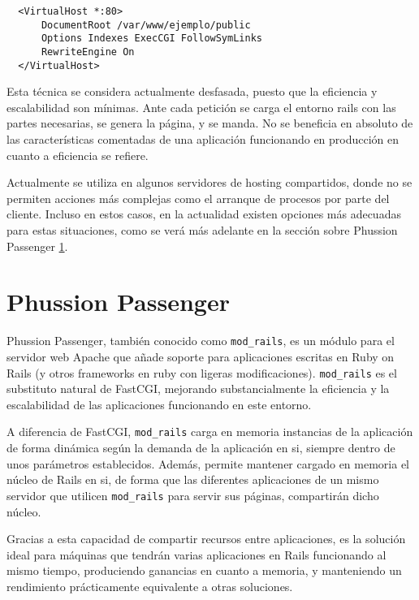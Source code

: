 \begin{verbatim}
  <VirtualHost *:80>
      DocumentRoot /var/www/ejemplo/public
      Options Indexes ExecCGI FollowSymLinks
      RewriteEngine On
  </VirtualHost>
\end{verbatim}

Esta técnica se considera actualmente desfasada, puesto que la eficiencia y escalabilidad son mínimas. Ante cada petición se carga el entorno rails con las partes necesarias, se genera la página, y se manda. No se beneficia en absoluto de las características comentadas de una aplicación funcionando en producción en cuanto a eficiencia se refiere.

Actualmente se utiliza en algunos servidores de hosting compartidos, donde no se permiten acciones más complejas como el arranque de procesos por parte del cliente. Incluso en estos casos, en la actualidad existen opciones más adecuadas para estas situaciones, como se verá más adelante en la sección sobre Phussion Passenger \ref{sub:phussion_passenger}.


\section{Phussion Passenger} %
\label{sub:phussion_passenger}

Phussion Passenger, también conocido como \texttt{mod\_rails}, es un módulo para el servidor web Apache que añade soporte para aplicaciones escritas en Ruby on Rails (y otros frameworks en ruby con ligeras modificaciones). \texttt{mod\_rails} es el substituto natural de FastCGI, mejorando substancialmente la eficiencia y la escalabilidad de las aplicaciones funcionando en este entorno.

A diferencia de FastCGI, \texttt{mod\_rails} carga en memoria instancias de la aplicación de forma dinámica según la demanda de la aplicación en si, siempre dentro de unos parámetros establecidos. Además, permite mantener cargado en memoria el núcleo de Rails en si, de forma que las diferentes aplicaciones de un mismo servidor que utilicen \texttt{mod\_rails} para servir sus páginas, compartirán dicho núcleo.

Gracias a esta capacidad de compartir recursos entre aplicaciones, es la solución ideal para máquinas que tendrán varias aplicaciones en Rails funcionando al mismo tiempo, produciendo ganancias en cuanto a memoria, y manteniendo un rendimiento prácticamente equivalente a otras soluciones.

